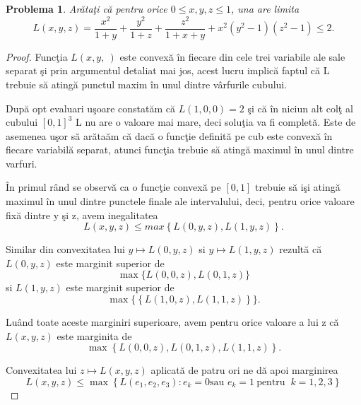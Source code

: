 \documentclass[a4paper,12pt,oneside]{report}
\newtheorem{problem}{Problema}
\begin{document}
\begin{problem}
	Ar\u{a}ta\c{t}i c\u{a} pentru orice \(0\leq x , y , z \leq 1\), una are limita
\begin{displaymath}
  L\left ( x , y , z \right ) = \frac{x^{2}}{1 + y} + \frac{y^{2}}{1 + z} + \frac{z^{2}}{1 + x+ y} + x^{2} \left ( y^{2} - 1 \right )\left ( z^{2} - 1 \right ) \leq 2.
\end{displaymath}
\end{problem}
\begin{proof}
Func\c{t}ia \(L\left ( x,y,\ \right )\) este convex\u{a} \^{i}n fiecare din cele trei variabile ale sale separat \c{s}i prin argumentul detaliat mai jos, acest lucru implic\u{a} faptul c\u{a} L trebuie s\u{a} ating\u{a} punctul maxim  \^{i}n unul dintre v\^{a}rfurile cubului.

Dup\u{a} opt evaluari u\c{s}oare constat\u{a}m c\u{a} \(L \left ( 1,0,0 \right ) = 2\) \c{s}i c\u{a} \^{i}n niciun alt col\c{t} al cubului $[0, 1]^3$ L nu are o valoare mai mare, deci solu\c{t}ia va fi complet\u{a}. Este de asemenea u\c{s}or s\u{a} ar\u{a}ta\u{a}m c\u{a} dac\u{a} o func\c{t}ie definit\u{a} pe cub este convex\u{a} \^{i}n fiecare variabil\u{a} separat, atunci func\c{t}ia trebuie s\u{a} ating\u{a} maximul \^{i}n unul dintre varfuri.

\^{I}n primul r\^{a}nd se observ\u{a} ca o func\c{t}ie convex\u{a} pe \(\left [ 0 , 1 \right ]\) trebuie s\u{a} i\c{s}i ating\u{a} maximul \^{i}n unul dintre punctele finale ale intervalului, deci, pentru orice valoare fix\u{a} dintre y \c{s}i z, avem inegalitatea
\begin{displaymath}
  L\left ( x,y,z \right )\leq max \left \{ L\left ( 0,y,z \right ), L\left ( 1,y,z \right ) \right \}.
\end{displaymath}

 Similar din convexitatea lui \(y \mapsto L\left ( 0,y,z \right )\) si \(y \mapsto L\left ( 1,y,z \right )\)  rezult\u{a} c\u{a} \(L\left ( 0, y, z \right )\) este marginit superior de  \[\max \{L\left ( 0,0,z \right ), L\left ( 0,1,z \right )\}\] si \( L\left ( 1,y,z \right )\) este marginit superior de \[\max \{\left \{ L\left ( 1,0,z \right ) , L \left ( 1,1,z \right )\right \}\}.\]

 Lu\^{a}nd toate aceste marginiri superioare, avem pentru orice valoare a lui z c\u{a} \(L\left ( x,y,z \right )\) este marginita de
 \[\max\left \{ L\left ( 0,0,z \right ), L\left ( 0,1,z \right ), L\left ( 1,1,z \right ) \right \}.\]

 Convexitatea lui \(z \mapsto L\left ( x,y,z \right )\) aplicat\u{a} de patru ori ne d\u{a} apoi marginirea
 \begin{displaymath}
  L\left ( x,y,z \right ) \leq  \max \left \{ L\left ( e_{1} , e_{2}, e_{3}\right ): e_{k}  = 0 \text{sau } e_{k} = 1 ~\text{pentru }~ k = 1,2,3\right \}
\end{displaymath}
\end{proof}
\end{document}
